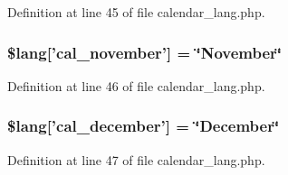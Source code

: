 Definition at line 45 of file calendar\-\_\-lang.\-php.

\hypertarget{calendar__lang_8php_aa05ad18c3c08c3184efd08188bdc2c56}{
\subsubsection[{\$lang}]{\setlength{\rightskip}{0pt plus 5cm}\$lang\mbox{[}'cal\-\_\-november'\mbox{]} = \char`\"{}November\char`\"{}}}\label{calendar__lang_8php_aa05ad18c3c08c3184efd08188bdc2c56}


Definition at line 46 of file calendar\-\_\-lang.\-php.

\hypertarget{calendar__lang_8php_ac4bbc26ddae9900021fe967b02bc7a6c}{
\subsubsection[{\$lang}]{\setlength{\rightskip}{0pt plus 5cm}\$lang\mbox{[}'cal\-\_\-december'\mbox{]} = \char`\"{}December\char`\"{}}}\label{calendar__lang_8php_ac4bbc26ddae9900021fe967b02bc7a6c}


Definition at line 47 of file calendar\-\_\-lang.\-php.

